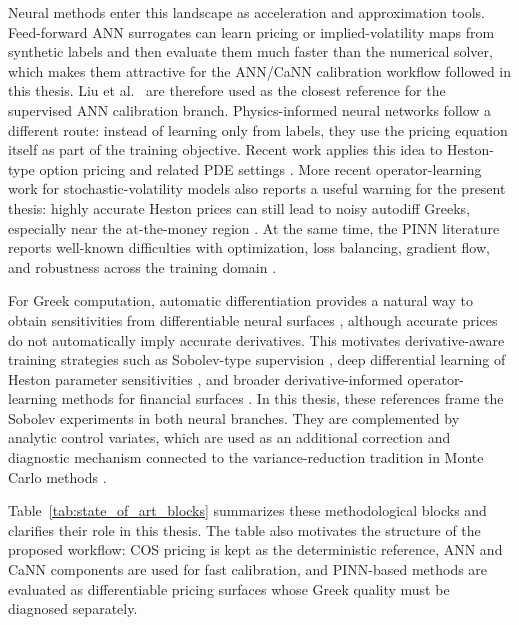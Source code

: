 Neural methods enter this landscape as acceleration and approximation tools. Feed-forward ANN surrogates can learn pricing or implied-volatility maps from synthetic labels and then evaluate them much faster than the numerical solver, which makes them attractive for the ANN/CaNN calibration workflow followed in this thesis. Liu et al.~\cite{liu} are therefore used as the closest reference for the supervised ANN calibration branch. Physics-informed neural networks follow a different route: instead of learning only from labels, they use the pricing equation itself as part of the training objective. Recent work applies this idea to Heston-type option pricing and related PDE settings \cite{hainaut2024pinn,yu2022gpinn}. More recent operator-learning work for stochastic-volatility models also reports a useful warning for the present thesis: highly accurate Heston prices can still lead to noisy autodiff Greeks, especially near the at-the-money region \cite{malandain2025deepsvm}. At the same time, the PINN literature reports well-known difficulties with optimization, loss balancing, gradient flow, and robustness across the training domain \cite{wang2021gradientpath,wang2022pinnntk,urban_2025}.

For Greek computation, automatic differentiation provides a natural way to obtain sensitivities from differentiable neural surfaces \cite{baydin2018autodiff}, although accurate prices do not automatically imply accurate derivatives. This motivates derivative-aware training strategies such as Sobolev-type supervision \cite{czarnecki2017sobolev}, deep differential learning of Heston parameter sensitivities \cite{amici2024ddn}, and broader derivative-informed operator-learning methods for financial surfaces \cite{noguer2026derivative_operator}. In this thesis, these references frame the Sobolev experiments in both neural branches. They are complemented by analytic control variates, which are used as an additional correction and diagnostic mechanism connected to the variance-reduction tradition in Monte Carlo methods \cite{glasserman2004montecarlo}.

Table~\ref{tab:state_of_art_blocks} summarizes these methodological blocks and clarifies their role in this thesis. The table also motivates the structure of the proposed workflow: COS pricing is kept as the deterministic reference, ANN and CaNN components are used for fast calibration, and PINN-based methods are evaluated as differentiable pricing surfaces whose Greek quality must be diagnosed separately.

